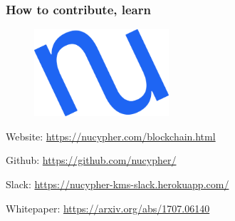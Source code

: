 \documentclass[xetex,mathsans,sans]{beamer}
\begin{document}
    \begin{frame}
        \frametitle{How to contribute, learn}
        \begin{figure}
            \centering
            \includegraphics[width=5cm]{pdf/nucypher_logo.pdf}
        \end{figure}
        Website: \url{https://nucypher.com/blockchain.html}

        Github: \url{https://github.com/nucypher/}

        Slack: \url{https://nucypher-kms-slack.herokuapp.com/}

        Whitepaper: \url{https://arxiv.org/abs/1707.06140}
    \end{frame}
\end{document}
